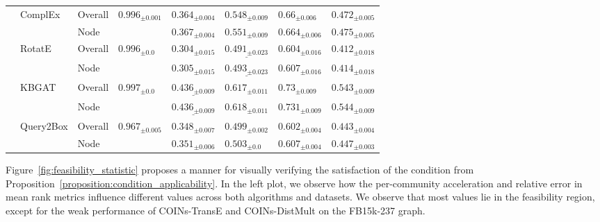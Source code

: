 \begin{table}[ht!]
\begin{adjustbox}{width=\textwidth}
\begin{tabular}{llllllll}
         & ComplEx & Overall &  ${{0.996}_{\pm 0.001}}$ &     $\mathbf{{0.364}_{\pm 0.004}}$ &     $\mathbf{{0.548}_{\pm 0.009}}$ &      $\mathbf{{0.66}_{\pm 0.006}}$ &     $\mathbf{{0.472}_{\pm 0.005}}$ \\
         &           & Node &                          &     $\mathbf{{0.367}_{\pm 0.004}}$ &     $\mathbf{{0.551}_{\pm 0.009}}$ &     $\mathbf{{0.664}_{\pm 0.006}}$ &     $\mathbf{{0.475}_{\pm 0.005}}$ \\
         & RotatE & Overall &    ${{0.996}_{\pm 0.0}}$ &            ${{0.304}_{\pm 0.015}}$ &  $\underline{{0.491}_{\pm 0.023}}$ &     $\mathbf{{0.604}_{\pm 0.016}}$ &            ${{0.412}_{\pm 0.018}}$ \\
         &           & Node &                          &            ${{0.305}_{\pm 0.015}}$ &  $\underline{{0.493}_{\pm 0.023}}$ &     $\mathbf{{0.607}_{\pm 0.016}}$ &            ${{0.414}_{\pm 0.018}}$ \\
         & KBGAT & Overall &    ${{0.997}_{\pm 0.0}}$ &  $\underline{{0.436}_{\pm 0.009}}$ &     $\mathbf{{0.617}_{\pm 0.011}}$ &      $\mathbf{{0.73}_{\pm 0.009}}$ &     $\mathbf{{0.543}_{\pm 0.009}}$ \\
         &           & Node &                          &  $\underline{{0.436}_{\pm 0.009}}$ &     $\mathbf{{0.618}_{\pm 0.011}}$ &     $\mathbf{{0.731}_{\pm 0.009}}$ &     $\mathbf{{0.544}_{\pm 0.009}}$ \\
         & Query2Box & Overall &  ${{0.967}_{\pm 0.005}}$ &     $\mathbf{{0.348}_{\pm 0.007}}$ &     $\mathbf{{0.499}_{\pm 0.002}}$ &     $\mathbf{{0.602}_{\pm 0.004}}$ &     $\mathbf{{0.443}_{\pm 0.004}}$ \\
         &           & Node &                          &     $\mathbf{{0.351}_{\pm 0.006}}$ &       $\mathbf{{0.503}_{\pm 0.0}}$ &     $\mathbf{{0.607}_{\pm 0.004}}$ &     $\mathbf{{0.447}_{\pm 0.003}}$ \\
\bottomrule
\end{tabular}
    \end{adjustbox}
\end{table}%

Figure~\ref{fig:feasibility_statistic} proposes a manner for visually verifying the satisfaction of the condition from Proposition~\ref{proposition:condition_applicability}. In the left plot, we observe how the per-community acceleration and relative error in mean rank metrics influence different values across both algorithms and datasets. We observe that most values lie in the feasibility region, except for the weak performance of COINs-TransE and COINs-DistMult on the FB15k-237 graph. 

